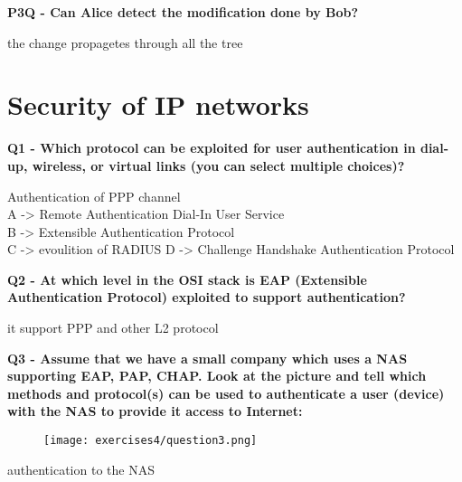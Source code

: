 \textbf{P3Q - Can Alice detect the modification done by Bob?}
\textcolor{Comment}{the change propagetes through all the tree}

\section*{Security of IP networks}
\textbf{Q1 - Which protocol can be exploited for user authentication in dial-up, wireless, or virtual links (you can select multiple choices)?}
\textcolor{Comment}{
    Authentication of PPP channel\\
    A -> Remote Authentication Dial-In User Service \\
    B -> Extensible Authentication Protocol\\
    C -> evoulition of RADIUS
    D -> Challenge Handshake Authentication Protocol 
}

\textbf{Q2 - At which level in the OSI stack is EAP (Extensible Authentication Protocol) exploited to support authentication?}
\textcolor{Comment}{it support PPP and other L2 protocol }

\textbf{Q3 - Assume that we have a small company which uses a NAS supporting EAP, PAP, CHAP. Look at the picture and tell which methods and protocol(s) can be used to authenticate a user (device) with the NAS to provide it access to Internet:}
\begin{figure}[h]
    \centering
    \texttt{[image: exercises4/question3.png]}
\end{figure}
\textcolor{Comment}{ authentication to the NAS  }

